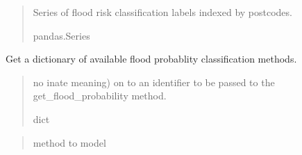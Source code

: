\documentclass[letterpaper,10pt,english]{sphinxmanual}
\begin{document}
\begin{fulllineitems}
\begin{fulllineitems}
\begin{quote}
\begin{description}
\begin{itemize}
\end{itemize}

\sphinxAtStartPar
Series of flood risk classification labels indexed by postcodes.

\sphinxAtStartPar
pandas.Series

\end{description}\end{quote}

\end{fulllineitems}


\begin{fulllineitems}
\label{\detokenize{index:flood_tool.Tool.get_flood_class_methods}}
\pysigstartsignatures
{}
\pysigstopsignatures
\sphinxAtStartPar
Get a dictionary of available flood probablity classification methods.
\begin{quote}\begin{description}
\sphinxAtStartPar
\begin{description}
\sphinxAtStartPar
no inate meaning) on to an identifier to be passed to the
get\_flood\_probability method.

\end{description}


\sphinxAtStartPar
dict

\end{description}\end{quote}

\end{fulllineitems}


\begin{fulllineitems}
\label{\detokenize{index:flood_tool.Tool.get_flood_class_models}}
\pysigstartsignatures
{}
\pysigstopsignatures\begin{quote}\begin{description}
\sphinxAtStartPar
method to model


\end{description}
\end{quote}
\end{fulllineitems}
\end{fulllineitems}
\end{document}
